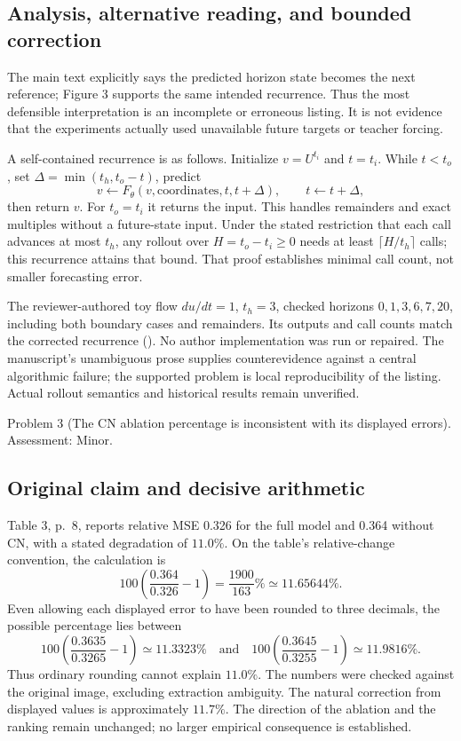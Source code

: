 \documentclass[10pt]{article}
\begin{document}
\subsection*{Analysis, alternative reading, and bounded correction}
The main text explicitly says the predicted horizon state becomes the next reference; Figure 3 supports the same intended recurrence. Thus the most defensible interpretation is an incomplete or erroneous listing. It is not evidence that the experiments actually used unavailable future targets or teacher forcing.\par
A self-contained recurrence is as follows. Initialize \(v=U^{t_i}\) and \(t=t_i\). While \(t<t_o\), set \(\Delta=\min(t_h,t_o-t)\), predict \[v\leftarrow F_\theta(v,\text{coordinates},t,t+\Delta),\qquad
t\leftarrow t+\Delta,\] then return \(v\). For \(t_o=t_i\) it returns the input. This handles remainders and exact multiples without a future-state input. Under the stated restriction that each call advances at most \(t_h\), any rollout over \(H=t_o-t_i\geq0\) needs at least \(\lceil H/t_h\rceil\) calls; this recurrence attains that bound. That proof establishes minimal call count, not smaller forecasting error.\par
The reviewer-authored toy flow \(du/dt=1\), \(t_h=3\), checked horizons \(0,1,3,6,7,20\), including both boundary cases and remainders. Its outputs and call counts match the corrected recurrence (). No author implementation was run or repaired. The manuscript’s unambiguous prose supplies counterevidence against a central algorithmic failure; the supported problem is local reproducibility of the listing. Actual rollout semantics and historical results remain unverified.\par
Problem 3 (The CN ablation percentage is inconsistent with its displayed errors).  Assessment: Minor.\par
\subsection*{Original claim and decisive arithmetic}
Table 3, p. 8, reports relative MSE 0.326 for the full model and 0.364 without CN, with a stated degradation of \(11.0\%\). On the table’s relative-change convention, the calculation is \[100\left(\frac{0.364}{0.326}-1\right)=\frac{1900}{163}\%
\simeq11.65644\%.\] Even allowing each displayed error to have been rounded to three decimals, the possible percentage lies between \[100\left(\frac{0.3635}{0.3265}-1\right)\simeq11.3323\%
\quad\text{and}\quad
100\left(\frac{0.3645}{0.3255}-1\right)\simeq11.9816\%.\] Thus ordinary rounding cannot explain \(11.0\%\). The numbers were checked against the original image, excluding extraction ambiguity. The natural correction from displayed values is approximately \(11.7\%\). The direction of the ablation and the ranking remain unchanged; no larger empirical consequence is established.\par
\end{document}
